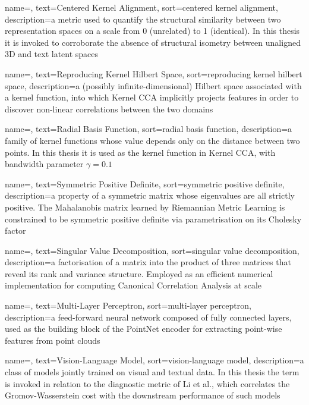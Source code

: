  {
    name=,
    text=Centered Kernel Alignment,
    sort=centered kernel alignment,
    description={a metric used to quantify the structural similarity between two representation spaces on a scale from 0 (unrelated) to 1 (identical). In this thesis it is invoked to corroborate the absence of structural isometry between unaligned 3D and text latent spaces}
}

 {
    name=,
    text=Reproducing Kernel Hilbert Space,
    sort=reproducing kernel hilbert space,
    description={a (possibly infinite-dimensional) Hilbert space associated with a kernel function, into which Kernel CCA implicitly projects features in order to discover non-linear correlations between the two domains}
}

 {
    name=,
    text=Radial Basis Function,
    sort=radial basis function,
    description={a family of kernel functions whose value depends only on the distance between two points. In this thesis it is used as the kernel function in Kernel CCA, with bandwidth parameter $\gamma = 0.1$}
}

 {
    name=,
    text=Symmetric Positive Definite,
    sort=symmetric positive definite,
    description={a property of a symmetric matrix whose eigenvalues are all strictly positive. The Mahalanobis matrix learned by Riemannian Metric Learning is constrained to be symmetric positive definite via parametrisation on its Cholesky factor}
}

 {
    name=,
    text=Singular Value Decomposition,
    sort=singular value decomposition,
    description={a factorisation of a matrix into the product of three matrices that reveal its rank and variance structure. Employed as an efficient numerical implementation for computing Canonical Correlation Analysis at scale}
}

 {
    name=,
    text=Multi-Layer Perceptron,
    sort=multi-layer perceptron,
    description={a feed-forward neural network composed of fully connected layers, used as the building block of the PointNet encoder for extracting point-wise features from point clouds}
}

 {
    name=,
    text=Vision-Language Model,
    sort=vision-language model,
    description={a class of models jointly trained on visual and textual data. In this thesis the term is invoked in relation to the diagnostic metric of Li et al., which correlates the Gromov-Wasserstein cost with the downstream performance of such models}
}

